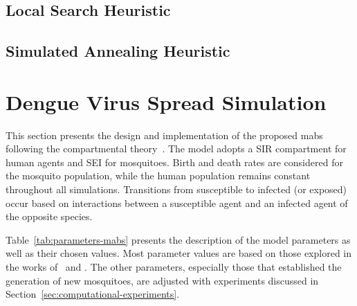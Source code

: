 \subsection{Local Search Heuristic}

\subsection{Simulated Annealing Heuristic}

\section{Dengue Virus Spread Simulation}\label{sec:dengue-virus-spread-simulation}

This section presents the design and implementation of the proposed \gls{mabs}
following the compartmental theory~\citep{amaku:2014}. The model adopts a SIR
compartment for human agents and SEI for mosquitoes. Birth and death rates are
considered for the mosquito population, while the human population remains
constant throughout all simulations. Transitions from susceptible to infected
(or exposed) occur based on interactions between a susceptible agent and an
infected agent of the opposite species.

Table~\ref{tab:parameters-mabs} presents the description of the model parameters
as well as their chosen values. Most parameter values are based on those
explored in the works of~\cite{da-silva:2020} and \cite{dwivedi:2022}. The other
parameters, especially those that established the generation of new mosquitoes,
are adjusted with experiments discussed in
Section~\ref{sec:computational-experiments}.

